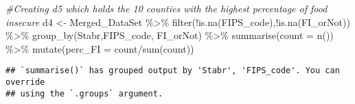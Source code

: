 \documentclass[
]{article}
\newenvironment{Shaded}{\begin{snugshade}}{\end{snugshade}}
\newcommand{\AttributeTok}[1]{\textcolor[rgb]{0.77,0.63,0.00}{#1}}
\newcommand{\CommentTok}[1]{\textcolor[rgb]{0.56,0.35,0.01}{\textit{#1}}}
\newcommand{\FunctionTok}[1]{\textcolor[rgb]{0.00,0.00,0.00}{#1}}
\newcommand{\NormalTok}[1]{#1}
\newcommand{\OtherTok}[1]{\textcolor[rgb]{0.56,0.35,0.01}{#1}}
\newcommand{\SpecialCharTok}[1]{\textcolor[rgb]{0.00,0.00,0.00}{#1}}
\begin{document}
\begin{Shaded}
\begin{Highlighting}[]
\CommentTok{\#Creating d5 which holds the 10 counties with the highest percentage of food insecure}
\NormalTok{d4 }\OtherTok{\textless{}{-}}\NormalTok{ Merged\_DataSet }\SpecialCharTok{\%\textgreater{}\%} \FunctionTok{filter}\NormalTok{(}\SpecialCharTok{!}\FunctionTok{is.na}\NormalTok{(FIPS\_code),}\SpecialCharTok{!}\FunctionTok{is.na}\NormalTok{(FI\_orNot)) }\SpecialCharTok{\%\textgreater{}\%} 
  \FunctionTok{group\_by}\NormalTok{(Stabr,FIPS\_code, FI\_orNot) }\SpecialCharTok{\%\textgreater{}\%} 
  \FunctionTok{summarise}\NormalTok{(}\AttributeTok{count =} \FunctionTok{n}\NormalTok{()) }\SpecialCharTok{\%\textgreater{}\%} 
  \FunctionTok{mutate}\NormalTok{(}\AttributeTok{perc\_FI =}\NormalTok{ count}\SpecialCharTok{/}\FunctionTok{sum}\NormalTok{(count))}
\end{Highlighting}
\end{Shaded}

\begin{verbatim}
## `summarise()` has grouped output by 'Stabr', 'FIPS_code'. You can override
## using the `.groups` argument.
\end{verbatim}
\end{document}
